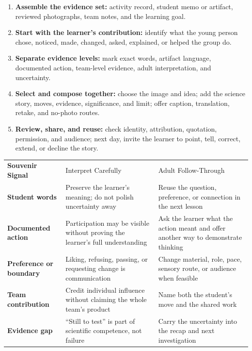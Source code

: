 \begin{enumerate}
	\item \textbf{Assemble the evidence set:} activity record, student memo or artifact, reviewed photographs, team notes, and the learning goal.
	\item \textbf{Start with the learner's contribution:} identify what the young person chose, noticed, made, changed, asked, explained, or helped the group do.
	\item \textbf{Separate evidence levels:} mark exact words, artifact language, documented action, team-level evidence, adult interpretation, and uncertainty.
	\item \textbf{Select and compose together:} choose the image and idea; add the science story, moves, evidence, significance, and limit; offer caption, translation, retake, and no-photo routes.
	\item \textbf{Review, share, and reuse:} check identity, attribution, quotation, permission, and audience; next day, invite the learner to point, tell, correct, extend, or decline the story.
\end{enumerate}


\renewcommand{\arraystretch}{1.00}
\setlength{\tabcolsep}{4pt}
\begin{tabularx}{\textwidth}{>{\bfseries\RaggedRight\arraybackslash}p{1.20in} >{\RaggedRight\arraybackslash}p{2.65in} >{\RaggedRight\arraybackslash}X}
\rowcolor{MidTeal}
\color{white}Souvenir Signal & \color{white}Interpret Carefully & \color{white}Adult Follow-Through \\
Student words & Preserve the learner's meaning; do not polish uncertainty away & Reuse the question, preference, or connection in the next lesson \\
\rowcolor{SoftGray}
Documented action & Participation may be visible without proving the learner's full understanding & Ask the learner what the action meant and offer another way to demonstrate thinking \\
Preference or boundary & Liking, refusing, passing, or requesting change is communication & Change material, role, pace, sensory route, or audience when feasible \\
\rowcolor{SoftGray}
Team contribution & Credit individual influence without claiming the whole team's product & Name both the student's move and the shared work \\
Evidence gap & ``Still to test'' is part of scientific competence, not failure & Carry the uncertainty into the recap and next investigation \\
\end{tabularx}
\normalsize

